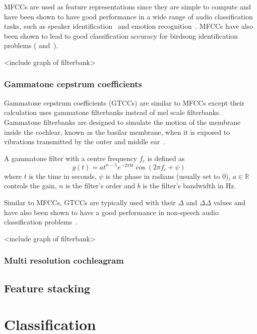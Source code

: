 MFCCs are used as feature representations since they are simple to compute and
have been shown to have good performance in a wide range of audio classification
tasks, such as speaker identification~\cite{muda2010voice} and emotion
recognition~\cite{likitha2017speech}. MFCCs have also been shown to lead to good
classification accuracy for birdsong identification problems
(\cite{fagerlund2007bird} and~\cite{ramashini2022robust}).

<include graph of filterbank>

\subsubsection{Gammatone cepstrum coefficients}

Gammatone cepstrum coefficients (GTCCs) are similar to MFCCs except their
calculation  uses gammatone filterbanks instead of mel scale filterbanks.
Gammatone filterbanks are designed to simulate the motion of the membrane inside
the cochlear, known as the basilar membrane, when it is exposed to vibrations
transmitted by the outer and middle ear~\cite{patterson1992complex}.

A gammatone filter with a centre frequency $f_c$ is defined as
\begin{equation}
  g(t) = at^{n-1}e^{-2\pi b t} \cos(2\pi f_c + \psi)
\end{equation}
where $t$ is the time in seconds, $\psi$ is the phase in radians (usually set to
0), $a \in \mathbb{R}$ controls the gain, $n$ is the filter's order and $b$ is
the filter's bandwidth in Hz.

Similar to MFCCs, GTCCs are typically used with their $\Delta$ and $\Delta\Delta$
values and have also been shown to have a good performance in
non-speech audio classification problems~\cite{valero2012gammatone}.

<include graph of filterbank>

\subsubsection{Multi resolution cochleagram}

\subsection{Feature stacking}

\section{Classification}

